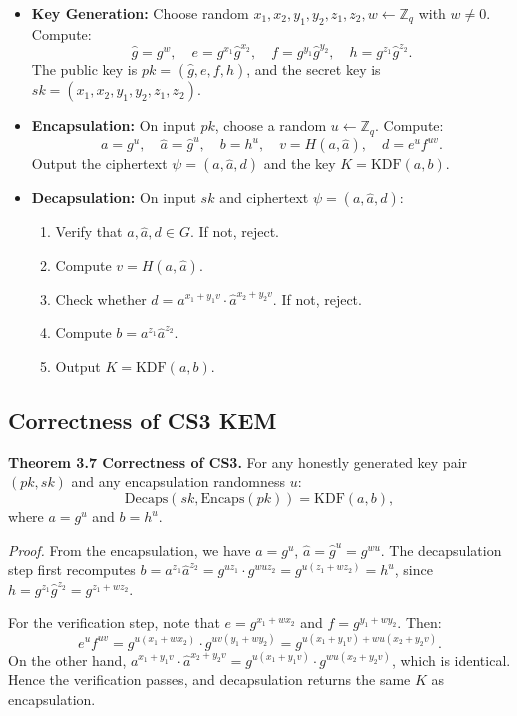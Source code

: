 \begin{itemize}
    \item \textbf{Key Generation:} Choose random $x_1, x_2, y_1, y_2, z_1, z_2, w \gets \mathbb{Z}_q$ with $w \neq 0$. Compute:
    $$
    \hat{g} = g^{w}, \quad e = g^{x_1} \hat{g}^{x_2}, \quad f = g^{y_1} \hat{g}^{y_2}, \quad h = g^{z_1} \hat{g}^{z_2}.
    $$
    The public key is $pk = (\hat{g}, e, f, h)$, and the secret key is $sk = (x_1, x_2, y_1, y_2, z_1, z_2)$.
    
    \item \textbf{Encapsulation:} On input $pk$, choose a random $u \gets \mathbb{Z}_q$. Compute:
    $$
    a = g^{u}, \quad \hat{a} = \hat{g}^{u}, \quad b = h^{u}, \quad v = H(a, \hat{a}), \quad d = e^{u} f^{u v}.
    $$
    Output the ciphertext $\psi = (a, \hat{a}, d)$ and the key $K = \text{KDF}(a, b)$.
    
    \item \textbf{Decapsulation:} On input $sk$ and ciphertext $\psi = (a, \hat{a}, d)$:
    \begin{enumerate}
        \item Verify that $a, \hat{a}, d \in G$. If not, reject.
        \item Compute $v = H(a, \hat{a})$.
        \item Check whether $d = a^{x_1 + y_1 v} \cdot \hat{a}^{x_2 + y_2 v}$. If not, reject.
        \item Compute $b = a^{z_1} \hat{a}^{z_2}$.
        \item Output $K = \text{KDF}(a, b)$.
    \end{enumerate}
\end{itemize}

\subsection{Correctness of CS3 KEM}

\noindent\textbf{Theorem 3.7 Correctness of CS3.} For any honestly generated key pair $(pk, sk)$ and any encapsulation randomness $u$:
$$
\text{Decaps}(sk, \text{Encaps}(pk)) = \text{KDF}(a, b),
$$
where $a = g^{u}$ and $b = h^{u}$.

\noindent\textit{Proof.} From the encapsulation, we have $a = g^{u}$, $\hat{a} = \hat{g}^{u} = g^{wu}$. 
The decapsulation step first recomputes $b = a^{z_1} \hat{a}^{z_2} = g^{u z_1} \cdot g^{wu z_2} = g^{u(z_1 + w z_2)} = h^{u}$, since $h = g^{z_1} \hat{g}^{z_2} = g^{z_1 + w z_2}$.

For the verification step, note that $e = g^{x_1 + w x_2}$ and $f = g^{y_1 + w y_2}$. Then:
$$
e^{u} f^{u v} = g^{u(x_1 + w x_2)} \cdot g^{u v (y_1 + w y_2)} = g^{u(x_1 + y_1 v) + w u (x_2 + y_2 v)}.
$$
On the other hand, $a^{x_1 + y_1 v} \cdot \hat{a}^{x_2 + y_2 v} = g^{u(x_1 + y_1 v)} \cdot g^{w u (x_2 + y_2 v)}$, which is identical. Hence the verification passes, and decapsulation returns the same $K$ as encapsulation.


